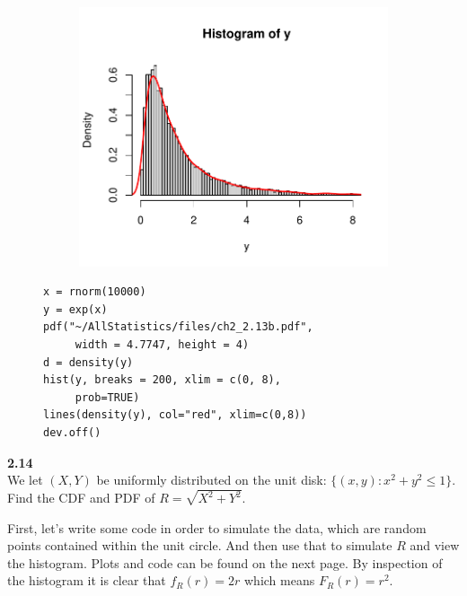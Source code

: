 \begin{figure}[H]
    \begin{minipage}{0.5\textwidth}
        \begin{center}
            \begin{figure}[H]
            \includegraphics[scale=0.65]{ch2_2.13b.pdf}
            \end{figure}
        \end{center}
    \end{minipage}
    \begin{minipage}{0.5\textwidth}
    \begin{lstlisting}[style=RSyntax]
x = rnorm(10000)
y = exp(x)
pdf("~/AllStatistics/files/ch2_2.13b.pdf",
     width = 4.7747, height = 4)
d = density(y)
hist(y, breaks = 200, xlim = c(0, 8),
     prob=TRUE)
lines(density(y), col="red", xlim=c(0,8))
dev.off()
    \end{lstlisting}
    \rule{0pt}{55pt}
\end{minipage}
\end{figure}

\bigskip\noindent
\textbf{2.14}\\  %
We let $(X,Y)$ be uniformly distributed on the unit disk:
$\{(x,y) : x^2 + y^2 \leq 1\}$. Find the CDF and PDF of
$R = \sqrt{X^2 + Y^2}$.

\medskip\noindent
First, let's write some code in order to simulate the data, which are random points contained
within the unit circle. And then use that to simulate $R$ and view the histogram. Plots and
code can be found on the next page. By inspection of the histogram it is clear that $f_R(r) = 2r$
which means $F_R(r) = r^2$.

